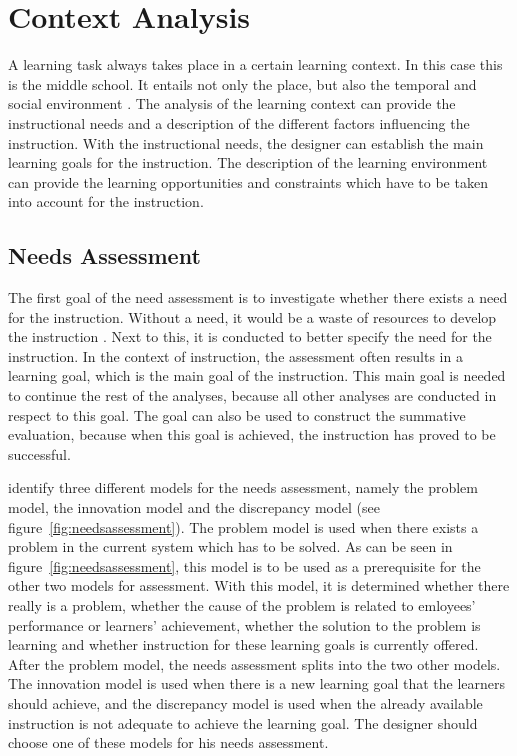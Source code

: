 \documentclass[11pt,twoside]{report} %
\begin{document}

\section{Context Analysis}

A learning task always takes place in a certain learning context. In this case this is the middle school. It entails not only the place, but also the temporal and social environment \cite{smithragan}. The analysis of the learning context can provide the instructional needs and a description of the different factors influencing the instruction. With the instructional needs, the designer can establish the main learning goals for the instruction. The description of the learning environment can provide the learning opportunities and constraints which have to be taken into account for the instruction.


\subsection{Needs Assessment}

The first goal of the need assessment is to investigate whether there exists a need for the instruction.  Without a need, it would be a waste of resources to develop the instruction \cite{smithragan}. Next to this, it is conducted to better specify the need for the instruction. In the context of instruction, the assessment often results in a learning goal, which is the main goal of the instruction. This main goal is needed to continue the rest of the analyses, because all other analyses are conducted in respect to this goal. The goal can also be used to construct the summative evaluation, because when this goal is achieved, the instruction has proved to be successful.

 identify three different models for the needs assessment, namely the problem model, the innovation model and the discrepancy model (see figure~\ref{fig:needsassessment}). The problem model is used when there exists a problem in the current system which has to be solved. As can be seen in figure~\ref{fig:needsassessment}, this model is to be used as a prerequisite for the other two models for assessment. With this model, it is determined whether there really is a problem, whether the cause of the problem is related to emloyees' performance or learners' achievement, whether the solution to the problem is learning and whether instruction for these learning goals is currently offered. After the problem model, the needs assessment splits into the two other models. The innovation model is used when there is a new learning goal that the learners should achieve, and the discrepancy model is used when the already available instruction is not adequate to achieve the learning goal. The designer should choose one of these models for his needs assessment.
\end{document}
